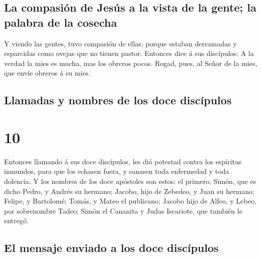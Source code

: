\hypertarget{la-compasiuxf3n-de-jesuxfas-a-la-vista-de-la-gente-la-palabra-de-la-cosecha}{%
\subsection{La compasión de Jesús a la vista de la gente; la palabra de
la
cosecha}\label{la-compasiuxf3n-de-jesuxfas-a-la-vista-de-la-gente-la-palabra-de-la-cosecha}}

 Y viendo las gentes, tuvo compasión de ellas; porque
estaban derramadas y esparcidas como ovejas que no tienen pastor.
 Entonces dice á sus discípulos: A la verdad la mies es
mucha, mas los obreros pocos.  Rogad, pues, al Señor de
la mies, que envíe obreros á su mies.

\hypertarget{llamadas-y-nombres-de-los-doce-discuxedpulos}{%
\subsection{Llamadas y nombres de los doce
discípulos}\label{llamadas-y-nombres-de-los-doce-discuxedpulos}}

\hypertarget{section-9}{%
\section{10}\label{section-9}}

 Entonces llamando á sus doce discípulos, les dió potestad
contra los espíritus inmundos, para que los echasen fuera, y sanasen
toda enfermedad y toda dolencia.  Y los nombres de los
doce apóstoles son estos: el primero, Simón, que es dicho Pedro, y
Andrés su hermano; Jacobo, hijo de Zebedeo, y Juan su hermano;
 Felipe, y Bartolomé; Tomás, y Mateo el publicano; Jacobo
hijo de Alfeo, y Lebeo, por sobrenombre Tadeo;  Simón el
Cananita y Judas Iscariote, que también le entregó.

\hypertarget{el-mensaje-enviado-a-los-doce-discuxedpulos}{%
\subsection{El mensaje enviado a los doce
discípulos}\label{el-mensaje-enviado-a-los-doce-discuxedpulos}}

